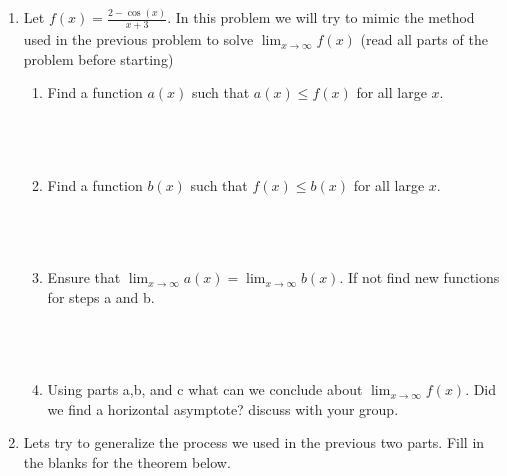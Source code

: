 \documentclass[12pt]{report}
\begin{document}
\begin{enumerate}
\item Let $\displaystyle{f(x)=\frac{2-\cos(x)}{x+3}}$. In this problem we will try to mimic the method used in the previous problem to solve $\displaystyle{\lim_{x\to \infty}f(x)}$ (read all parts of the problem before starting)
\begin{enumerate}[label=\alph*.]
    \item Find a function $a(x)$ such that $a(x)\leq f(x)$ for all large $x$.\\\\\\\\
    \item Find a function $b(x)$ such that $f(x)\leq b(x)$ for all large $x$.\\\\\\\\
    \item Ensure that $\displaystyle{\lim_{x\to \infty}a(x)}=\displaystyle{\lim_{x\to \infty}b(x)}$. If not find new functions for steps a and b.\\\\\\\\
    \item Using parts a,b, and c what can we conclude about $\displaystyle{\lim_{x\to \infty}f(x)}$. Did we find a horizontal asymptote? discuss with your group.
\end{enumerate}







\newpage
\item Lets try to generalize the process we used in the previous two parts. Fill in the blanks for the theorem below.
\end{enumerate} 
\end{document}
